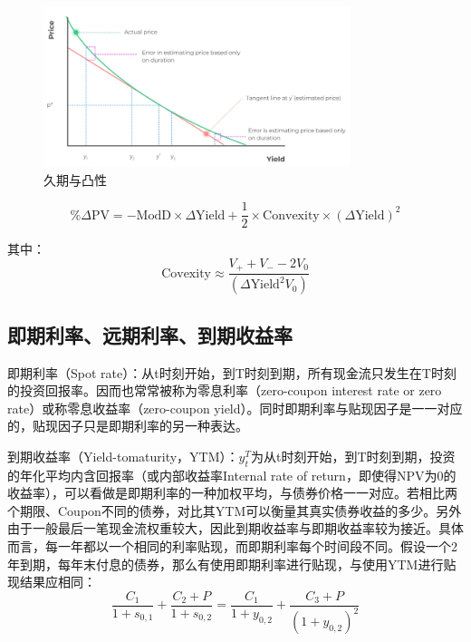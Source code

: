 \documentclass[11pt]{article}
\begin{document}
\begin{figure}[H]
    \centering
    \includegraphics[width=0.8\textwidth]{fig/duration-convexity.png}
    \caption{久期与凸性}
    \label{fig:duration-convexity}
\end{figure}

\begin{equation*}
    \%\Delta\text{PV} = -\text{ModD} \times \Delta\text{Yield} + \frac{1}{2} \times \text{Convexity} \times (\Delta\text{Yield})^2
\end{equation*}

其中：
\begin{equation*}
    \text{Covexity} \approx \frac{V_{+}+V_{-}-2 V_0}{(\Delta\text{Yield}^2 V_0)}
\end{equation*}


\subsection{即期利率、远期利率、到期收益率}

即期利率（Spot rate）：从t时刻开始，到T时刻到期，所有现金流只发生在T时刻的投资回报率。因而也常常被称为零息利率（zero-coupon interest rate or zero rate）或称零息收益率（zero-coupon yield）。同时即期利率与贴现因子是一一对应的，贴现因子只是即期利率的另一种表达。

到期收益率（Yield-tomaturity，YTM）：$y_t^T$为从t时刻开始，到T时刻到期，投资的年化平均内含回报率（或内部收益率Internal rate of return，即使得NPV为0的收益率），可以看做是即期利率的一种加权平均，与债券价格一一对应。若相比两个期限、Coupon不同的债券，对比其YTM可以衡量其真实债券收益的多少。另外由于一般最后一笔现金流权重较大，因此到期收益率与即期收益率较为接近。具体而言，每一年都以一个相同的利率贴现，而即期利率每个时间段不同。假设一个2年到期，每年末付息的债券，那么有使用即期利率进行贴现，与使用YTM进行贴现结果应相同：
\begin{equation*}
    \frac{C_1}{1+s_{0,1}} +\frac{C_2+P}{1+s_{0,2}} = 
    \frac{C_1}{1+y_{0,2}} +\frac{C_3+P}{(1+y_{0,2})^2}
\end{equation*}
\end{document}
